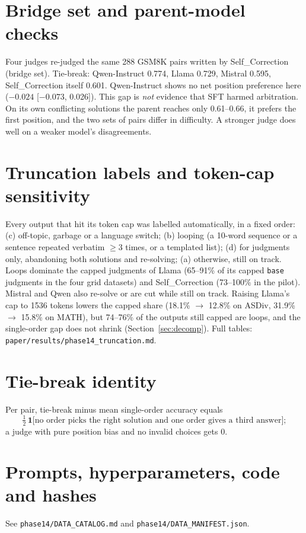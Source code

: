 \documentclass[11pt]{article}
\begin{document}
\section{Bridge set and parent-model checks}
Four judges re-judged the same 288 GSM8K pairs written by Self\_Correction (bridge set). Tie-break: Qwen-Instruct
0.774, Llama 0.729, Mistral 0.595, Self\_Correction itself 0.601. Qwen-Instruct shows no net position
preference here ($-0.024$ [$-0.073$, 0.026]). This gap is \emph{not} evidence that SFT harmed arbitration.
On its own conflicting solutions the parent reaches only 0.61--0.66, it prefers the first position, and the
two sets of pairs differ in difficulty. A stronger judge does well on a weaker model's disagreements.

\section{Truncation labels and token-cap sensitivity}
Every output that hit its token cap was labelled automatically, in a fixed order: (c) off-topic, garbage or a
language switch; (b) looping (a 10-word sequence or a sentence repeated verbatim $\geq$3 times, or a templated
list); (d) for judgments only, abandoning both solutions and re-solving; (a) otherwise, still on track. Loops
dominate the capped judgments of Llama (65--91\% of its capped \texttt{base} judgments in the four grid
datasets) and Self\_Correction (73--100\% in the pilot). Mistral and Qwen also re-solve or are cut while still on track. Raising Llama's cap
to 1536 tokens lowers the capped share (18.1\% $\to$ 12.8\% on ASDiv, 31.9\% $\to$ 15.8\% on MATH), but 74--76\%
of the outputs still capped are loops, and the single-order gap does not shrink (Section~\ref{sec:decomp}). Full tables:
\texttt{paper/results/phase14\_truncation.md}.
\section{Tie-break identity}\label{app:identity}Per pair, tie-break minus mean
single-order accuracy equals
\[\tfrac12\,\mathbf{1}\bigl[\text{no order picks the right solution and one order gives a third answer}\bigr];\]
a judge with pure position bias and no invalid choices gets 0.
\section{Prompts, hyperparameters, code and hashes}See \texttt{phase14/DATA\_CATALOG.md} and
\texttt{phase14/DATA\_MANIFEST.json}.
\end{document}

